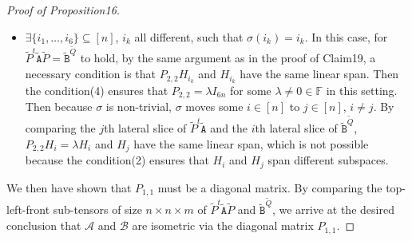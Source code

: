 \begin{proof}[Proof of Proposition16]
\begin{itemize}
But the condition(3) excludes the existence of such $P_{2,2}$, so this cannot happen.
\item $\exists\{i_1,\ldots,i_6\}\subseteq[n]$, $i_k$ all different, such that $\sigma(i_k)=i_k$. In this case, for $\widetilde P^t\widetilde{\mathtt A}\widetilde P=\widetilde{\mathtt B}^{\widetilde Q}$ to hold, by the same argument as in the proof of Claim19, a necessary condition is that $P_{2,2}H_{i_k}$ and $H_{i_k}$ have the same linear span. Then the condition(4) ensures that $P_{2,2}=\lambda I_{6n}$ for some $\lambda\ne0\in\mathbb F$ in this setting. Then because $\sigma$ is non-trivial, $\sigma$ moves some $i\in[n]$ to $j\in[n]$, $i\ne j$. By comparing the $j$th lateral slice of $\widetilde P^t\widetilde{\mathtt A}$ and the $i$th lateral slice of $\widetilde{\mathtt B}^{\widetilde Q}$, $P_{2,2}H_i=\lambda H_i$ and $H_j$ have the same linear span, which is not possible because the condition(2) ensures that $H_i$ and $H_j$ span different subspaces.
\end{itemize}
We then have shown that $P_{1,1}$ must be a diagonal matrix. By comparing the top-left-front sub-tensors of size $n\times n\times m$ of $\widetilde P^t\widetilde{\mathtt A}\widetilde P$ and $\widetilde{\mathtt B}^{\widetilde Q}$, we arrive at the desired conclusion that $\mathcal A$ and $\mathcal B$ are isometric via the diagonal matrix $P_{1,1}$.
\end{proof}

